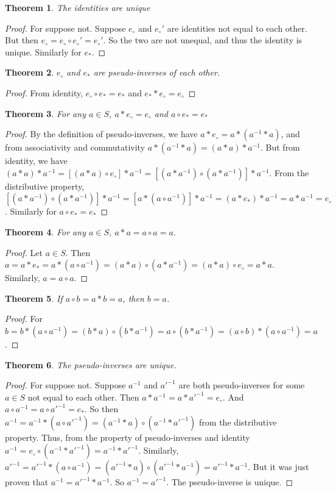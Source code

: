 \documentclass[12pt,oneside]{book}
\theoremstyle{mystyle}
\newtheorem{theorem}{Theorem}[section]
\begin{document}
\begin{theorem} The identities are unique
\end{theorem}
\begin{proof} For suppose not. Suppose $e_{\circ}$ and $e_{\circ}'$ are identities not equal to each other. But then $e_{\circ}=e_{\circ}\circ e_{\circ}'=e_{\circ}'$. So the two are not unequal, and thus the identity is unique. Similarly for $e_{*}$.
\end{proof}
\begin{theorem} $e_{\circ}$ and $e_{*}$ are pseudo-inverses of each other.
\end{theorem}
\begin{proof} From identity, $e_{\circ}\circ e_{*}=e_{*}$ and $e_{*}*e_{\circ}=e_{\circ}$
\end{proof}
\begin{theorem} For any $a\in S$, $a*e_{\circ}=e_{\circ}$ and $a\circ e_{*}=e_{*}$
\end{theorem}
\begin{proof} By the definition of pseudo-inverses, we have $a*e_{\circ}=a*(a^{-1}*a)$, and from associativity and commutativity $a*(a^{-1}*a)=(a*a)*a^{-1}$. But from identity, we have $(a*a)*a^{-1}=[(a*a)\circ e_{\circ}]*a^{-1}=[(a*a^{-1})\circ (a*a^{-1})]*a^{-1}$. From the distributive property, $[(a*a^{-1})\circ (a*a^{-1})]*a^{-1}=[a*(a\circ a^{-1})]*a^{-1}=(a*e_{*})*a^{-1}=a*a^{-1}=e_{\circ}$. Similarly for $a\circ e_{*}=e_{*}$
\end{proof}
\begin{theorem} For any $a\in S$, $a*a = a\circ a = a$.
\end{theorem}
\begin{proof} Let $a\in S$. Then $a=a*e_{*}=a*(a\circ a^{-1})=(a*a)\circ(a*a^{-1})=(a*a)\circ e_{\circ}=a*a$. Similarly, $a=a\circ a$.
\end{proof}
\begin{theorem} If $a\circ b = a*b = a$, then $b=a$. 
\end{theorem}
\begin{proof}
For $b = b*(a\circ a^{-1}) = (b*a)\circ(b* a^{-1})= a\circ (b* a^{-1}) = (a\circ b)*(a\circ a^{-1}) = a$.
\end{proof}
\begin{theorem} The pseudo-inverses are unique.
\end{theorem}
\begin{proof} For suppose not. Suppose $a^{-1}$ and $a'^{-1}$ are both pseudo-inverses for some $a\in S$ not equal to each other.  Then $a*a^{-1}=a* a'^{-1}=e_{\circ}$. And $a\circ a^{-1}=a\circ a'^{-1}=e_{*}$. So then $a^{-1}=a^{-1}*(a\circ a'^{-1})=(a^{-1}*a)\circ (a^{-1}*a'^{-1})$ from the distributive property. Thus, from the property of pseudo-inverses and identity $a^{-1}=e_{\circ}\circ (a^{-1}*a'^{-1})=a^{-1}*a'^{-1}$. Similarly, $a'^{-1}=a'^{-1}*(a\circ a^{-1})=(a'^{-1}*a)\circ (a'^{-1}*a^{-1})=a'^{-1}*a^{-1}$. But it was just proven that $a^{-1}=a'^{-1}*a^{-1}$. So $a^{-1}=a'^{-1}$. The pseudo-inverse is unique.
\end{proof}
\end{document}
